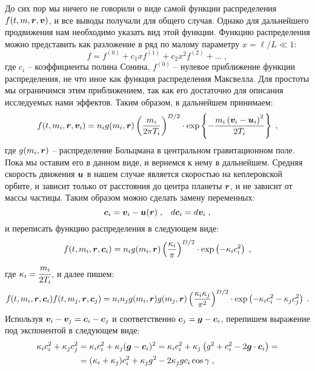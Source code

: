 До сих пор мы ничего не говорили о виде самой функции распределения $f(t,m,\bm{r},\bm{v})$, и все выводы получали для общего 
случая. Однако для дальнейшего продвижения нам необходимо указать вид этой функции. Функцию распределения можно представить
как разложение в ряд по малому параметру $x=\ell/L\ll 1$:
\begin{equation}
  f = f^{(0)} + c_1xf^{(1)}+c_2x^2f^{(2)}+\dots\;,
\end{equation}
где $c_i$ -- коэффициенты полина Сонина, $f^{(0)}$ -- нулевое приближение функции распределения, не что иное как функция
распределения Максвелла. Для простоты мы ограничимся этим приближением, так как его достаточно для описания исследуемых нами эффектов.
Таким образом, в дальнейшем принимаем:
\begin{equation}\label{eq:Maxwell_distribution}
  f(t,m_i,\bm{r},\bm{v}_i) = n_i g(m_i,\bm{r})\left(\frac{m_i}{2\pi T_i}\right)^{D/2}\cdot\exp\left\{-\frac{m_i\left(\bm{v}_i-\bm{u}_i\right)^2}{2T_i}\right\}\;,
\end{equation}
где $g(m_i,\bm{r})$ -- распределение Больцмана в центральном гравитационном поле. Пока мы оставим его в данном виде, и вернемся к нему 
в дальнейшем. Средняя скорость движения $\bm{u}$ в нашем случае является скоростью на кеплеровской орбите, и зависит только от 
расстояния до центра планеты $\bm{r}$, и не зависит от массы частицы. Таким образом можно сделать замену переменных:
\begin{equation}
  \bm{c}_i = \bm{v}_i - \bm{u}(\bm{r})\;,\;\;\;d\bm{c}_i=d\bm{v}_i\;,
\end{equation}
и переписать функцию распределения в следующем виде:
\begin{equation}
  f(t,m_i,\bm{r},\bm{c}_i) = n_ig(m_i,\bm{r})\left(\frac{\kappa_i}{\pi}\right)^{D/2}\cdot\exp\left(-\kappa_ic^2_i\right)\;,
\end{equation}
где $\kappa_i=\cfrac{m_i}{2T_i}$, и далее пишем:
\begin{equation}
  f(t,m_i,\bm{r},\bm{c}_i)f(t,m_j,\bm{r},\bm{c}_j)=n_in_jg(m_i,\bm{r})g(m_j,\bm{r})\left(\frac{\kappa_i\kappa_j}{\pi^2}\right)^{D/2}
  \cdot\exp\left(-\kappa_ic^2_i-\kappa_jc^2_j\right)\;.
\end{equation}
 Используя $\bm{v}_i-\bm{v}_j=\bm{c}_i-\bm{c}_j$ и соответственно $\bm{c}_j=\bm{g}-\bm{c}_i$, перепишем выражение под экспонентой в следующем виде:
 \begin{equation}
   \begin{split}
     \kappa_ic^2_i+\kappa_jc^2_j &= \kappa_ic^2_i+\kappa_j(\bm{g}-\bm{c}_i)^2=\kappa_ic^2_i+\kappa_j\left(g^2+c^2_i-2\bm{g}\cdot\bm{c}_i\right)=\\
     &=(\kappa_i+\kappa_j)c^2_i+\kappa_jg^2-2\kappa_jgc_i\cos\gamma\;,
   \end{split}
 \end{equation}
